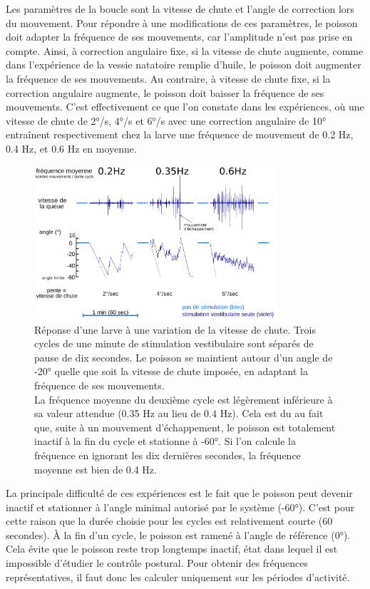 Les paramètres de la boucle sont la vitesse de chute et l'angle de correction lors du mouvement. Pour répondre à une modifications de ces paramètres, le poisson doit adapter la fréquence de ses mouvements, car l'amplitude n'est pas prise en compte. Ainsi, à correction angulaire fixe, si la vitesse de chute augmente, comme dans l'expérience de la vessie natatoire remplie d'huile, le poisson doit augmenter la fréquence de ses mouvements. Au contraire, à vitesse de chute fixe, si la correction angulaire augmente, le poisson doit baisser la fréquence de ses mouvements. C'est effectivement ce que l'on constate dans les expériences, où une vitesse de chute de 2°/s, 4°/s et 6°/s avec une correction angulaire de 10° entraînent respectivement chez la larve une fréquence de mouvement de 0.2 Hz, 0.4 Hz, et 0.6 Hz en moyenne.

\begin{figure}
\centering
\includegraphics[width=0.8\textwidth]{./files/variation-vitesse.svg.png}
\caption{
Réponse d'une larve à une variation de la vitesse de chute. Trois cycles de une minute de stimulation vestibulaire sont séparés de pause de dix secondes. Le poisson se maintient autour d'un angle de -20° quelle que soit la vitesse de chute imposée, en adaptant la fréquence de ses mouvements.
\\
La fréquence moyenne du deuxième cycle est légèrement inférieure à sa valeur attendue (0.35 Hz au lieu de 0.4 Hz). Cela est du au fait que, suite à un mouvement d'échappement, le poisson est totalement inactif à la fin du cycle et stationne à -60°. Si l'on calcule la fréquence en ignorant les dix dernières secondes, la fréquence moyenne est bien de 0.4 Hz.
}
\end{figure}


La principale difficulté de ces expériences est le fait que le poisson peut devenir inactif et stationner à l'angle minimal autorisé par le système (-60°). C'est pour cette raison que la durée choisie pour les cycles est relativement courte (60 secondes). À la fin d'un cycle, le poisson est ramené à l'angle de référence (0°). Cela évite que le poisson reste trop longtemps inactif, état dans lequel il est impossible d'étudier le contrôle postural. Pour obtenir des fréquences représentatives, il faut donc les calculer uniquement sur les périodes d'activité.

